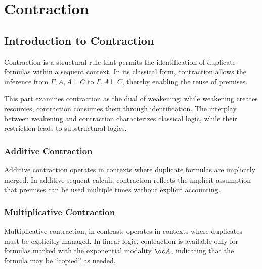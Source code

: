 

\part{Contraction}

\chapter*{Introduction to Contraction}
\label{sec-contraction-intro}
{}

Contraction is a structural rule that permits the identification of duplicate formulas within a sequent context. In its classical form, contraction allows the inference from $\Gamma, A, A \vdash C$ to $\Gamma, A \vdash C$, thereby enabling the reuse of premises.

This part examines contraction as the dual of weakening: while weakening creates resources, contraction consumes them through identification. The interplay between weakening and contraction characterizes classical logic, while their restriction leads to substructural logics.

\section*{Additive Contraction}
\label{sec-contraction-additive}

Additive contraction operates in contexts where duplicate formulas are implicitly merged. In additive sequent calculi, contraction reflects the implicit assumption that premises can be used multiple times without explicit accounting.

\section*{Multiplicative Contraction}
\label{sec-contraction-multiplicative}

Multiplicative contraction, in contrast, operates in contexts where duplicates must be explicitly managed. In linear logic, contraction is available only for formulas marked with the exponential modality $\oc A$, indicating that the formula may be ``copied'' as needed.

